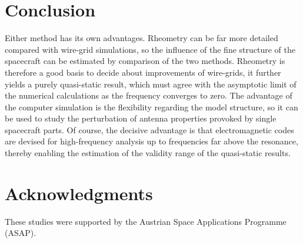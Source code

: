 \documentclass[a4paper,twocolumn]{esapub2005} %
\begin{document}
\section{Conclusion}
Either method has its own advantages. Rheometry can be far more detailed compared with wire-grid simulations, so the influence of the fine structure of the spacecraft can be estimated by comparison of the two methods. Rheometry is therefore a good basis to decide about improvements of wire-grids, it further yields a purely quasi-static result, which must agree with the asymptotic limit of the numerical calculations as the frequency converges to zero. The advantage of the computer simulation is the flexibility regarding the model structure, so it can be used to study the perturbation of antenna properties provoked by single spacecraft parts. Of course, the decisive advantage is that electromagnetic codes are devised for high-frequency analysis up to frequencies far above the resonance, thereby enabling the estimation of the validity range of the quasi-static results.





\section*{Acknowledgments}
These studies were supported by the Austrian Space Applications Programme (ASAP).



   
   
\end{document}
